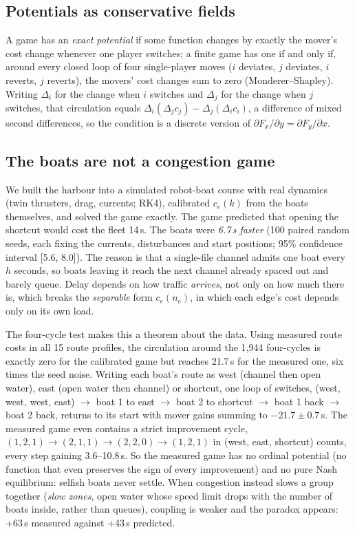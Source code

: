 \documentclass[10pt]{article}
\begin{document}
\subsection*{Potentials as conservative fields}
A game has an \emph{exact potential} if some function changes by exactly the mover's cost change whenever one player switches; a finite game has one if and only if, around every closed loop of four single-player moves ($i$ deviates, $j$ deviates, $i$ reverts, $j$ reverts), the movers' cost changes sum to zero (Monderer--Shapley). Writing $\Delta_i$ for the change when $i$ switches and $\Delta_j$ for the change when $j$ switches, that circulation equals $\Delta_i(\Delta_j c_j)-\Delta_j(\Delta_i c_i)$, a difference of mixed second differences, so the condition is a discrete version of $\partial F_x/\partial y=\partial F_y/\partial x$.

\subsection*{The boats are not a congestion game}
We built the harbour into a simulated robot-boat course with real dynamics (twin thrusters, drag, currents; RK4), calibrated $c_e(k)$ from the boats themselves, and solved the game exactly. The game predicted that opening the shortcut would cost the fleet 14\,s. The boats were \emph{6.7\,s faster} (100 paired random seeds, each fixing the currents, disturbances and start positions; 95\% confidence interval [5.6, 8.0]). The reason is that a single-file channel admits one boat every $h$ seconds, so boats leaving it reach the next channel already spaced out and barely queue. Delay depends on how traffic \emph{arrives}, not only on how much there is, which breaks the \emph{separable} form $c_e(n_e)$, in which each edge's cost depends only on its own load.

The four-cycle test makes this a theorem about the data. Using measured route costs in all 15 route profiles, the circulation around the 1{,}944 four-cycles is exactly zero for the calibrated game but reaches 21.7\,s for the measured one, six times the seed noise. Writing each boat's route as west (channel then open water), east (open water then channel) or shortcut, one loop of switches, (west, west, west, east) $\to$ boat 1 to east $\to$ boat 2 to shortcut $\to$ boat 1 back $\to$ boat 2 back, returns to its start with mover gains summing to $-21.7\pm0.7$\,s. The measured game even contains a strict improvement cycle, $(1,2,1)\to(2,1,1)\to(2,2,0)\to(1,2,1)$ in (west, east, shortcut) counts, every step gaining 3.6--10.8\,s. So the measured game has no ordinal potential (no function that even preserves the sign of every improvement) and no pure Nash equilibrium: selfish boats never settle. When congestion instead slows a group together (\emph{slow zones}, open water whose speed limit drops with the number of boats inside, rather than queues), coupling is weaker and the paradox appears: +63\,s measured against +43\,s predicted.
\end{document}
